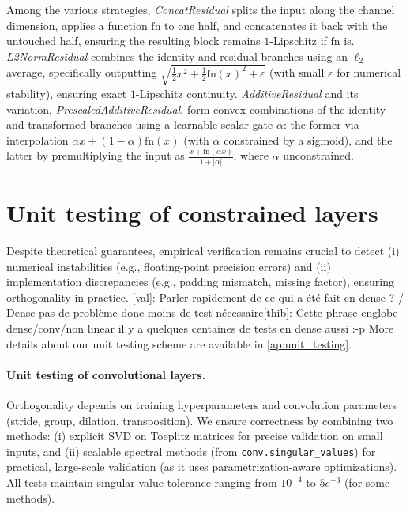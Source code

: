 \documentclass[10pt]{article}
\theoremstyle{plain}
\theoremstyle{definition}
\theoremstyle{remark}
\newcommand{\thib}[1]{{\color{blue}[thib]: #1}}
\newcommand{\va}[1]{{\color{yellow}[val]: #1}}
\newcommand{\thib}[1]{}
\newcommand{\va}[1]{}
\begin{document}
Among the various strategies, \textit{ConcatResidual} splits the input along the channel dimension, applies a function $\mathrm{fn}$ to one half, and concatenates it back with the untouched half, ensuring the resulting block remains $1$-Lipschitz if $\mathrm{fn}$ is. \textit{L2NormResidual} combines the identity and residual branches using an $\ell_{2}$ average, specifically outputting $\sqrt{\tfrac12 x^{2}+\tfrac12\mathrm{fn}(x)^{2}+\varepsilon}$ (with small $\varepsilon$ for numerical stability), ensuring exact $1$-Lipschitz continuity. \textit{AdditiveResidual} and its variation, \textit{PrescaledAdditiveResidual}, form convex combinations of the identity and transformed branches using a learnable scalar gate $\alpha$: the former via interpolation $\alpha x + (1-\alpha)\mathrm{fn}(x)$ (with $\alpha$ constrained by a sigmoid), and the latter by premultiplying the input as $ \frac{x+\mathrm{fn}(\alpha x)}{1+\lvert\alpha\rvert}$, where $\alpha$ unconstrained.





\section{Unit testing of constrained layers} \label{sec:unit_testing}

    
     Despite theoretical guarantees, empirical verification remains crucial to detect (i) numerical instabilities (e.g., floating-point precision errors) and (ii) implementation discrepancies (e.g., padding mismatch, missing factor), ensuring orthogonality in practice. \va{ Parler rapidement de ce qui a été fait en dense ? / Dense pas de problème donc moins de test nécessaire}\thib{Cette phrase englobe dense/conv/non linear il y a quelques centaines de tests en dense aussi :-p} More details about our unit testing scheme are available in \cref{ap:unit_testing}.

    \paragraph{Unit testing of convolutional layers.}
    Orthogonality depends on training hyperparameters and convolution parameters (stride, group, dilation, transposition). We ensure correctness by combining two methods: (i) explicit SVD on Toeplitz matrices for precise validation on small inputs, and (ii) scalable spectral methods (from \texttt{conv.singular\_values}) for practical, large-scale validation (as it uses parametrization-aware optimizations). All tests maintain singular value tolerance ranging from $10^{-4}$ to $5e^{-3}$ (for some methods).
    
\end{document}
